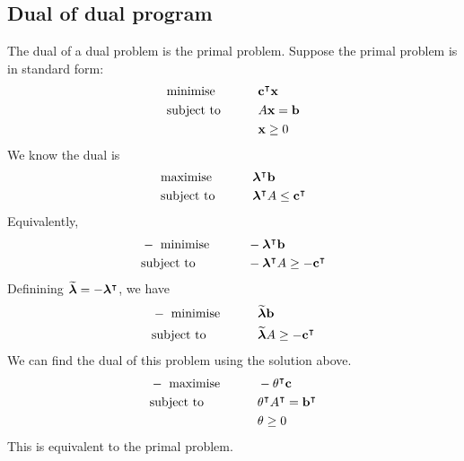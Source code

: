 \subsection{Dual of dual program}
The dual of a dual problem is the primal problem.
Suppose the primal problem is in standard form:
\begin{alignat*}{2}
	 & \text{minimise}   & \qquad & \vb c^\intercal \vb x \\
	 & \text{subject to} &        & A \vb x = \vb b        \\
	 &                   &        & \vb x \geq 0
\end{alignat*}
We know the dual is
\begin{alignat*}{2}
	 & \text{maximise}   & \qquad & \bm \lambda^\intercal \vb b                   \\
	 & \text{subject to} &        & \bm \lambda^\intercal A \leq \vb c^\intercal \\
\end{alignat*}
Equivalently,
\begin{alignat*}{2}
	 & -\text{ minimise} & \qquad & -\bm \lambda^\intercal \vb b                    \\
	 & \text{subject to} &        & -\bm \lambda^\intercal A \geq -\vb c^\intercal \\
\end{alignat*}
Definining \( \widetilde{\bm \lambda} = -\bm\lambda^\intercal \), we have
\begin{alignat*}{2}
	 & -\text{ minimise} & \qquad & \widetilde{\bm \lambda} \vb b                    \\
	 & \text{subject to} &        & \widetilde{\bm \lambda} A \geq -\vb c^\intercal \\
\end{alignat*}
We can find the dual of this problem using the solution above.
\begin{alignat*}{2}
	 & -\text{ maximise} & \qquad & -\vb \theta^\intercal \vb c                          \\
	 & \text{subject to} &        & \vb \theta^\intercal A^\intercal = \vb b^\intercal \\
	 &                   &        & \vb \theta \geq 0
\end{alignat*}
This is equivalent to the primal problem.


